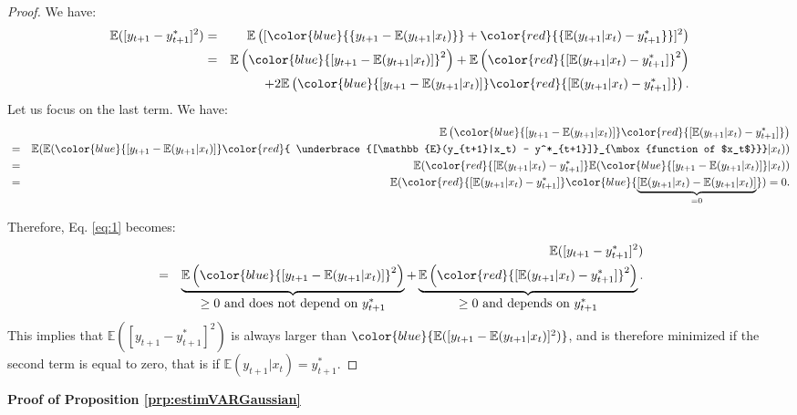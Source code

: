\documentclass[
  12pt,
]{book}
\theoremstyle{definition}
\theoremstyle{definition}
\theoremstyle{definition}
\theoremstyle{definition}
\theoremstyle{remark}
\begin{document}
\begin{proof}
We have:
\begin{eqnarray}
\mathbb{E}([y_{t+1} - y^*_{t+1}]^2) &=& \mathbb{E}\left([\color{blue}{\{y_{t+1} - \mathbb{E}(y_{t+1}|x_t)\}} + \color{red}{\{\mathbb{E}(y_{t+1}|x_t)  - y^*_{t+1}\}}]^2\right)\nonumber\\
&=&  \mathbb{E}\left(\color{blue}{[y_{t+1} - \mathbb{E}(y_{t+1}|x_t)]}^2\right) + \mathbb{E}\left(\color{red}{[\mathbb{E}(y_{t+1}|x_t)  - y^*_{t+1}]}^2\right)\nonumber\\
&& + 2\mathbb{E}\left( \color{blue}{[y_{t+1} - \mathbb{E}(y_{t+1}|x_t)]}\color{red}{ [\mathbb{E}(y_{t+1}|x_t)  - y^*_{t+1}]}\right). \label{eq:1}
\end{eqnarray}
Let us focus on the last term. We have:
\begin{eqnarray*}
&&\mathbb{E}\left(\color{blue}{[y_{t+1} - \mathbb{E}(y_{t+1}|x_t)]}\color{red}{ [\mathbb{E}(y_{t+1}|x_t)  - y^*_{t+1}]}\right)\\
&=& \mathbb{E}( \mathbb{E}( \color{blue}{[y_{t+1} - \mathbb{E}(y_{t+1}|x_t)]}\color{red}{ \underbrace{[\mathbb{E}(y_{t+1}|x_t)  - y^*_{t+1}]}_{\mbox{function of $x_t$}}}|x_t))\\
&=& \mathbb{E}( \color{red}{ [\mathbb{E}(y_{t+1}|x_t)  - y^*_{t+1}]} \mathbb{E}( \color{blue}{[y_{t+1} - \mathbb{E}(y_{t+1}|x_t)]}|x_t))\\
&=& \mathbb{E}( \color{red}{ [\mathbb{E}(y_{t+1}|x_t)  - y^*_{t+1}]} \color{blue}{\underbrace{[\mathbb{E}(y_{t+1}|x_t) - \mathbb{E}(y_{t+1}|x_t)]}_{=0}})=0.
\end{eqnarray*}

Therefore, Eq. \eqref{eq:1} becomes:
\begin{eqnarray*}
&&\mathbb{E}([y_{t+1} - y^*_{t+1}]^2) \\
&=&  \underbrace{\mathbb{E}\left(\color{blue}{[y_{t+1} - \mathbb{E}(y_{t+1}|x_t)]}^2\right)}_{\mbox{$\ge 0$ and does not depend on $y^*_{t+1}$}} + \underbrace{\mathbb{E}\left(\color{red}{[\mathbb{E}(y_{t+1}|x_t)  - y^*_{t+1}]}^2\right)}_{\mbox{$\ge 0$ and depends on $y^*_{t+1}$}}.
\end{eqnarray*}
This implies that \(\mathbb{E}([y_{t+1} - y^*_{t+1}]^2)\) is always larger than \(\color{blue}{\mathbb{E}([y_{t+1} - \mathbb{E}(y_{t+1}|x_t)]^2)}\), and is therefore minimized if the second term is equal to zero, that is if \(\mathbb{E}(y_{t+1}|x_t) = y^*_{t+1}\).
\end{proof}

\textbf{Proof of Proposition \ref{prp:estimVARGaussian}}
\end{document}
